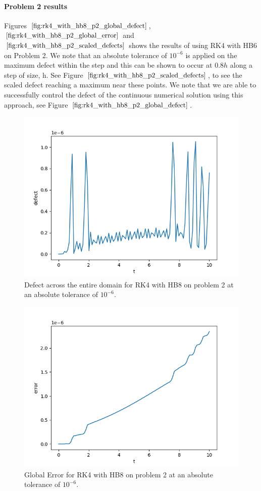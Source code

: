 \paragraph{Problem 2 results}
Figures $\ref{fig:rk4_with_hb8_p2_global_defect}$, $\ref{fig:rk4_with_hb8_p2_global_error}$ and $\ref{fig:rk4_with_hb8_p2_scaled_defects}$ shows the results of using RK4 with HB6 on Problem 2. We note that an absolute tolerance of $10^{-6}$ is applied on the maximum defect within the step and this can be shown to occur at $0.8h$ along a step of size, h. See Figure $\ref{fig:rk4_with_hb8_p2_scaled_defects}$, to see the scaled defect reaching a maximum near these points. We note that we are able to successfully control the defect of the continuous numerical solution using this approach, see Figure $\ref{fig:rk4_with_hb8_p2_global_defect}$. 

\begin{figure}[H]
\centering
\includegraphics[width=0.7\linewidth]{./figures/rk4_with_hb8_p2_global_defect}
\caption{Defect across the entire domain for RK4 with HB8 on problem 2 at an absolute tolerance of $10^{-6}$.}
\label{fig:rk4_with_hb8_p2_global_defect}
\end{figure}

\begin{figure}[H]
\centering
\includegraphics[width=0.7\linewidth]{./figures/rk4_with_hb8_p2_global_error}
\caption{Global Error for RK4 with HB8 on problem 2 at an absolute tolerance of $10^{-6}$.}
\label{fig:rk4_with_hb8_p2_global_error}
\end{figure}


